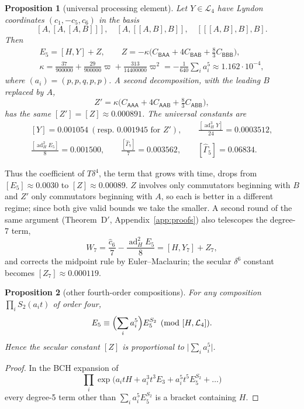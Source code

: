 \documentclass[11pt]{article}
\newcommand{\ad}{\operatorname{ad}}
\newcommand{\abs}[1]{\lvert #1\rvert}
\newcommand{\Lie}{\mathcal{L}}
\newcommand{\C}[1]{C_{\mathsf{#1}}}
\newcommand{\lb}[1]{[#1]}
\theoremstyle{plain}
\newtheorem{proposition}{Proposition}
\theoremstyle{definition}
\theoremstyle{remark}
\begin{document}
\begin{proposition}[universal processing element]\label{prop:Z}
Let $Y\in\Lie_4$ have Lyndon coordinates $(c_1,-c_5,c_6)$ in the basis
\[
[A,[A,[A,B]]],\quad[A,[[A,B],B]],\quad[[[A,B],B],B].
\]
Then
\begin{gather*}
E_5=[H,Y]+Z,\qquad Z=-\kappa\bigl(\C{BAA}+4\C{BAB}+\tfrac83\C{BBB}\bigr),\\
\kappa=\tfrac{37}{900000}+\tfrac{29}{900000}\varpi+\tfrac{313}{14400000}\varpi^2=-\tfrac{1}{640}\textstyle\sum_ia_i^5\approx1.162\cdot10^{-4},
\end{gather*}
where $(a_i)=(p,p,q,p,p)$. A second decomposition, with the leading $B$ replaced by $A$,
\[
Z'=\kappa\bigl(\C{AAA}+4\C{AAB}+\tfrac83\C{ABB}\bigr),
\]
has the same $\lb{Z'}=\lb Z\approx0.000891$. The universal constants are
\[
\begin{gathered}
\lb Y=0.001054\ (\text{resp. }0.001945\text{ for }Z'),\qquad \tfrac{\lb{\ad_H^3Y}}{24}=0.0003512,\\
\tfrac{\lb{\ad_H^2E_5}}{8}=0.001500,\qquad \tfrac{\lb{\hat\Gamma_7}}{7}=0.003562,\qquad \lb{\hat\Gamma_5}=0.06834.
\end{gathered}
\]
\end{proposition}

Thus the coefficient of $T\delta^4$, the term that grows with time, drops from
$\lb{E_5}\approx0.0030$ to $\lb Z\approx0.00089$. $Z$ involves only commutators beginning with $B$ and
$Z'$ only commutators beginning with $A$, so each is better in a different regime; since both give
valid bounds we take the smaller. A second round of the same argument (Theorem~D$'$, Appendix~\ref{app:proofs}) also telescopes
the degree-7 term,
\[
W_7=\frac{\hat c_6}{7}-\frac{\ad_H^2E_5}{8}=[H,Y_7]+Z_7,
\]
and corrects the midpoint rule by Euler--Maclaurin; the secular $\delta^6$ constant becomes
$\lb{Z_7}\approx0.000119$.

\begin{proposition}[other fourth-order compositions]\label{prop:struct}
For any composition $\prod_iS_2(a_it)$ of order four,
\[
E_5\equiv\Bigl(\sum_ia_i^5\Bigr)E_5^{S_2}\pmod{[H,\Lie_4]}.
\]
Hence the secular constant $\lb Z$ is
proportional to $\abs{\sum_ia_i^5}$.
\end{proposition}

\begin{proof}
In the BCH expansion of
\[
\prod_i\exp\bigl(a_itH+a_i^3t^3E_3+a_i^5t^5E_5^{S_2}+\dots\bigr)
\]
every degree-5 term other than $\sum_ia_i^5E_5^{S_2}$ is a bracket containing $H$.
\end{proof}
\end{document}
